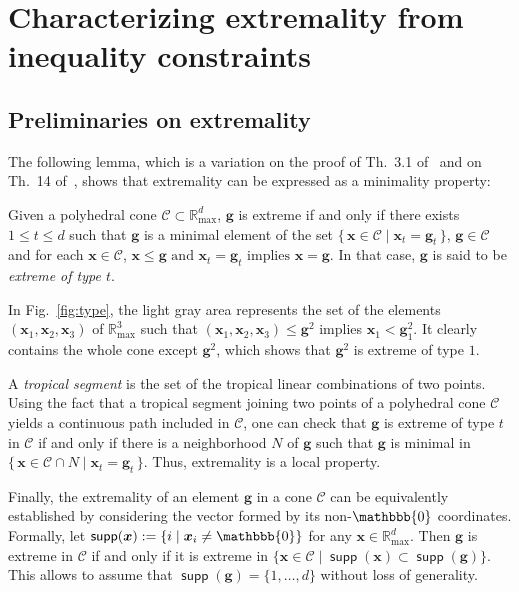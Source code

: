 \documentclass[proceedings]{stacs}
\newcommand{\maxplus}{\mathbb{R}_{\max}}
\newcommand{\defin}{:=}\newcommand{\mpzero}{\mathbbb{0}}
\newcommand{\vect}[1]{\boldsymbol #1}
\newcommand{\CC}{\mathcal{C}}
\newcommand{\supp}{\operatorname{\mathsf{supp}}}
\begin{document}
\section{Characterizing extremality from inequality constraints}\label{sec:extremality_criterion}

\subsection{Preliminaries on extremality}

The following lemma, which is a variation on the proof of Th.~3.1 of~\cite{GK} and on Th.~14 of~\cite{BSS}, 
shows that extremality can be expressed as a minimality property:
\begin{proposition}\label{prop:minimality}
Given a polyhedral cone $\CC \subset \maxplus^d$, $\vect{g}$ is extreme if and only if there exists $1 \leq t \leq d$ such that $\vect{g}$ is a minimal element of the set $\{\, \vect{x} \in \CC \mid \vect{x}_t = \vect{g}_t \,\}$, \ie{} $\vect g\in \CC$ and for each $\vect{x} \in \CC$, 
$\vect{x} \leq \vect{g} \text{ and } \vect{x}_t = \vect{g}_t \text{ implies } \vect{x} = \vect{g}.$
In that case, $\vect{g}$ is said to be \emph{extreme of type $t$}.
\end{proposition}





In Fig.~\ref{fig:type}, the light gray area represents the set of the elements $(\vect{x}_1,\vect{x}_2,\vect{x}_3)$ of $\maxplus^3$ such that $(\vect{x}_1,\vect{x}_2,\vect{x}_3) \leq \vect{g}^2$ implies $\vect{x}_1 < \vect{g}^2_1$. It clearly contains the whole cone except $\vect{g}^2$, which shows that $\vect{g}^2$ is extreme of type $1$.


A {\em tropical segment} is the set of the tropical 
linear combinations of two points. Using the fact
that a tropical segment joining two points of a polyhedral cone $\CC$
yields a continuous path included in $\CC$, one can check that $\vect g$ is extreme of type $t$ in $\CC$ if and only if 
there is a neighborhood $N$ of $\vect{g}$ such that $\vect{g}$ is minimal in $\{\, \vect{x} \in \CC \cap N \mid \vect{x}_t = \vect{g}_t \,\}$. Thus, extremality is a local property.

Finally, the extremality of an element $\vect{g}$ in a cone $\CC$ can be equivalently established by considering the vector formed by its non-$\mpzero$ coordinates. 
Formally, let $\supp(\vect{x}) \defin \{i\mid \vect{x}_i\neq\mpzero\}$ for any $\vect{x} \in \maxplus^d$.
Then $\vect{g}$ is extreme in $\CC$ if and only if it is extreme in $\{ \vect{x} \in \CC \mid \supp(\vect{x}) \subset \supp(\vect{g}) \}$. This allows to assume that $\supp(\vect{g}) =\{1,\ldots,d\}$ without loss of generality.
\end{document}

